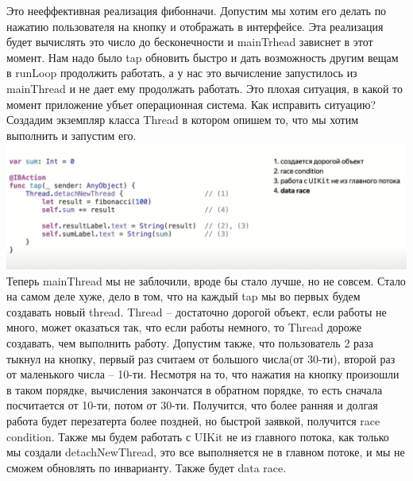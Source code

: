 \documentclass{article}
\begin{document}
    \newline
    Это нееффективная реализация фибонначи. Допустим мы хотим его делать по нажатию пользователя на кнопку и отображать в интерфейсе. 
    \newline
    \newline
    Эта реализация будет вычислять это число до бесконечности и mainTrhead зависнет в этот момент. Нам надо было tap обновить быстро и дать возможность другим вещам в runLoop продолжить работать, а у нас это вычисление запустилось из mainThread и не дает ему продолжать работать. Это плохая ситуация, в какой то момент приложение убъет операционная система. Как исправить ситуацию?
    \newline
    \newline
    Создадим экземпляр класса Thread в котором опишем то, что мы хотим выполнить и запустим его. 
    \newline
    \includegraphics[scale = 0.3]{pic/Снимок экрана 2023-08-04 в 11.48.11.png}
    \newline
    Теперь mainThread мы не заблочили, вроде бы стало лучше, но не совсем. Стало на самом деле хуже, дело в том, что на каждый tap мы во первых будем создавать новый thread. Thread -- достаточно дорогой объект, если работы не много, может оказаться так, что если работы немного, то Thread дороже создавать, чем выполнить работу. 
    \newline
    Допустим также, что пользователь 2 раза тыкнул на кнопку, первый раз считаем от большого числа(от 30-ти), второй раз от маленького числа -- 10-ти. Несмотря на то, что нажатия на кнопку произошли в таком порядке, вычисления закончатся в обратном порядке, то есть сначала посчитается от 10-ти, потом от 30-ти. Получится, что более ранняя и долгая работа будет перезатерта более поздней, но быстрой заявкой, получится race condition.
    \newline
    \newline
    Также мы будем работать с UIKit не из главного потока, как только мы создали detachNewThread, это все выполняется не в главном потоке, и мы не сможем обновлять по инварианту. 
    \newline
    \newline
    Также будет data race.
\end{document}
